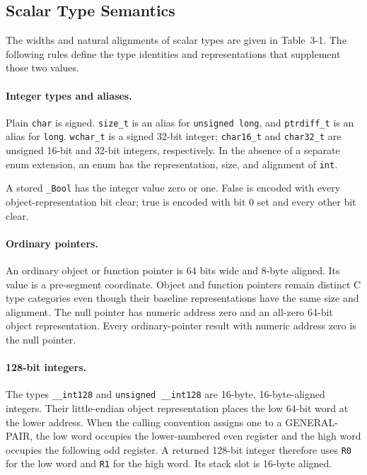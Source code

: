 \documentclass[10pt,twoside]{article}
\begin{document}
\subsection{Scalar Type Semantics}
The widths and natural alignments of scalar types are given in
Table~3-1. The following rules define the type identities and representations
that supplement those two values.

\paragraph{Integer types and aliases.}
Plain \texttt{char} is signed. \texttt{size\_t} is an alias for
\texttt{unsigned long}, and \texttt{ptrdiff\_t} is an alias for
\texttt{long}. \texttt{wchar\_t} is a signed 32-bit integer;
\texttt{char16\_t} and \texttt{char32\_t} are unsigned 16-bit and 32-bit
integers, respectively. In the absence of a separate enum extension, an enum
has the representation, size, and alignment of \texttt{int}.

A stored \texttt{\_Bool} has the integer value zero or one. False is encoded
with every object-representation bit clear; true is encoded with bit 0 set and
every other bit clear.

\paragraph{Ordinary pointers.}
An ordinary object or function pointer is 64 bits wide and 8-byte aligned. Its
value is a pre-segment coordinate. Object and function pointers remain distinct C type categories
even though their baseline representations have the same size and alignment.
The null pointer has numeric address zero and an all-zero
64-bit object representation. Every ordinary-pointer result with numeric
address zero is the null pointer.

\paragraph{128-bit integers.}
The types \texttt{\_\_int128} and \texttt{unsigned \_\_int128} are 16-byte,
16-byte-aligned integers. Their little-endian object representation places the
low 64-bit word at the lower address. When the calling convention assigns one
to a GENERAL-PAIR, the low word occupies the lower-numbered even register and
the high word occupies the following odd register. A returned 128-bit integer
therefore uses \texttt{R0} for the low word and \texttt{R1} for the high word.
Its stack slot is 16-byte aligned.
\end{document}
